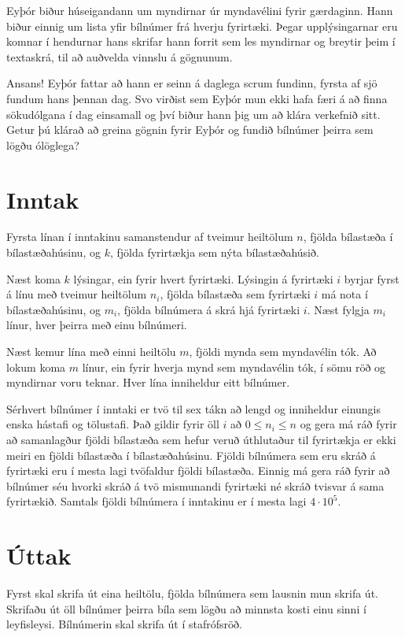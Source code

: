 Eyþór biður húseigandann um myndirnar úr myndavélini fyrir gærdaginn.
Hann biður einnig um lista yfir bílnúmer frá hverju fyrirtæki.
Þegar upplýsingarnar eru komnar í hendurnar hans skrifar hann forrit sem les myndirnar
og breytir þeim í textaskrá, til að auðvelda vinnslu á gögnunum.

Ansans! Eyþór fattar að hann er seinn á daglega scrum fundinn, fyrsta af sjö fundum hans þennan dag.
Svo virðist sem Eyþór mun ekki hafa færi á að finna sökudólgana í dag einsamall og því biður hann þig um að klára verkefnið sitt.
Getur þú klárað að greina gögnin fyrir Eyþór og fundið bílnúmer þeirra sem lögðu ólöglega?

\section*{Inntak}
Fyrsta línan í inntakinu samanstendur af tveimur heiltölum $n$, fjölda bílastæða í bílastæðahúsinu, og $k$, fjölda fyrirtækja sem nýta bílastæðahúsið.

Næst koma $k$ lýsingar, ein fyrir hvert fyrirtæki.
Lýsingin á fyrirtæki $i$ byrjar fyrst á línu með tveimur heiltölum $n_i$, fjölda bílastæða sem fyrirtæki $i$ má nota í bílastæðahúsinu, og $m_i$, fjölda bílnúmera á skrá hjá fyrirtæki $i$.
Næst fylgja $m_i$ línur, hver þeirra með einu bílnúmeri.

Næst kemur lína með einni heiltölu $m$, fjöldi mynda sem myndavélin tók.
Að lokum koma $m$ línur, ein fyrir hverja mynd sem myndavélin tók, í sömu röð og myndirnar voru teknar.
Hver lína inniheldur eitt bílnúmer.

Sérhvert bílnúmer í inntaki er tvö til sex tákn að lengd og inniheldur einungis enska hástafi og tölustafi.
Það gildir fyrir öll $i$ að $0 \leq n_i \leq n$ og gera má ráð fyrir að samanlagður fjöldi bílastæða sem hefur veruð úthlutaður til fyrirtækja er ekki meiri en fjöldi bílastæða í bílastæðahúsinu.
Fjöldi bílnúmera sem eru skráð á fyrirtæki eru í mesta lagi tvöfaldur fjöldi bílastæða.
Einnig má gera ráð fyrir að bílnúmer séu hvorki skráð á tvö mismunandi fyrirtæki né skráð tvisvar á sama fyrirtækið.
Samtals fjöldi bílnúmera í inntakinu er í mesta lagi $4 \cdot 10^5$.

\section*{Úttak}
Fyrst skal skrifa út eina heiltölu, fjölda bílnúmera sem lausnin mun skrifa út.
Skrifaðu út öll bílnúmer þeirra bíla sem lögðu að minnsta kosti einu sinni í leyfisleysi.
Bílnúmerin skal skrifa út í stafrófsröð.

